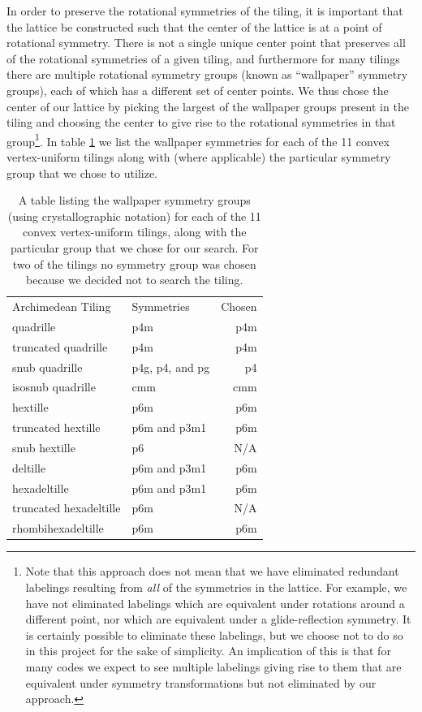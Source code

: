 \documentclass[12pt]{amsbook}
\theoremstyle{plain}
\theoremstyle{definition}
\theoremstyle{remark}
\begin{document}
In order to preserve the rotational symmetries of the tiling, it is important that the lattice be constructed such that the center of the lattice is at a point of rotational symmetry.  There is not a single unique center point that preserves all of the rotational symmetries of a given tiling, and furthermore for many tilings there are multiple rotational symmetry groups (known as ``wallpaper'' symmetry groups), each of which has a different set of center points.  We thus chose the center of our lattice by picking the largest of the wallpaper groups present in the tiling and choosing the center to give rise to the rotational symmetries in that group\footnote{Note that this approach does not mean that we have eliminated redundant labelings resulting from \emph{all} of the symmetries in the lattice.  For example, we have not eliminated labelings which are equivalent under rotations around a different point, nor which are equivalent under a glide-reflection symmetry.  It is certainly possible to eliminate these labelings, but we choose not to do so in this project for the sake of simplicity.  An implication of this is that for many codes we expect to see multiple labelings giving rise to them that are equivalent under symmetry transformations but not eliminated by our approach.}.  In table \ref{table:symmetries} we list the wallpaper symmetries for each of the 11 convex vertex-uniform tilings along with (where applicable) the particular symmetry group that we chose to utilize.

\begin{table}
\begin{tabular}{llr}
\toprule
Archimedean Tiling & Symmetries & Chosen\\
quadrille & p4m & p4m \\
truncated quadrille & p4m & p4m \\
snub quadrille & p4g, p4, and pg & p4 \\
isosnub quadrille & cmm & cmm \\
hextille & p6m & p6m \\
truncated hextille & p6m and p3m1 & p6m \\
snub hextille & p6 & N/A \\
deltille & p6m and p3m1 & p6m \\
hexadeltille & p6m and p3m1 & p6m \\
truncated hexadeltille & p6m & N/A \\
rhombihexadeltille & p6m & p6m \\
\bottomrule
\end{tabular}
\caption[Symmetry groups of the tilings]{
\label{table:symmetries}
A table listing the wallpaper symmetry groups (using crystallographic notation) for each of the 11 convex vertex-uniform tilings, along with the particular group that we chose for our search.  For two of the tilings no symmetry group was chosen because we decided not to search the tiling.
}
\end{table}
\end{document}
